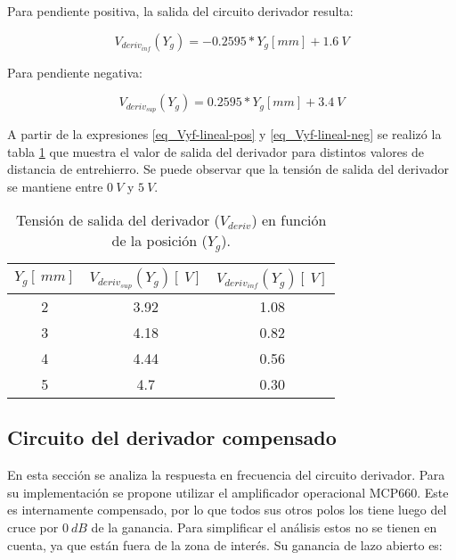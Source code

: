 
Para pendiente positiva, la salida del circuito derivador resulta:

\begin{equation} \label{eq_Vyf-lineal-pos}
	V_{deriv_{inf}}(Y_g) = -0.2595*Y_g[mm] + 1.6\:V
\end{equation}


Para pendiente negativa:

\begin{equation} \label{eq_Vyf-lineal-neg}
	V_{deriv_{sup}}(Y_g) = 0.2595*Y_g[mm] + 3.4\:V
\end{equation}


A partir de la expresiones \ref{eq_Vyf-lineal-pos} y \ref{eq_Vyf-lineal-neg} se realizó la tabla \ref{tab_Vyf_vs_y} que muestra el valor de salida del derivador para distintos valores de distancia de entrehierro. Se puede observar que la tensión de salida del derivador se mantiene entre $0\:V$ y $5\:V$.

\begin{table}[H]
	\begin{center}
		\begin{tabular}{| c | c | c |}
			\hline
			$Y_g[\:mm]$ & $V_{deriv_{sup}}(Y_g) [\:V]$ & $V_{deriv_{inf}}(Y_g) [\:V]$
			\\ \hline
			2 & 3.92 & 1.08\\ \hline 
			3 & 4.18 & 0.82\\ \hline 
			4 & 4.44 & 0.56\\ \hline 
			5 & 4.7  & 0.30\\ \hline 
		\end{tabular}
		\caption{Tensión de salida del derivador ($V_{deriv}$) en función de la posición ($Y_g$).}
		\label{tab_Vyf_vs_y}
	\end{center}
\end{table}


\subsection{Circuito del derivador compensado}

En esta sección se analiza la respuesta en frecuencia del circuito derivador. Para su implementación se propone utilizar el amplificador operacional MCP660. Este es internamente compensado, por lo que todos sus otros polos los tiene luego del cruce por $0\:dB$ de la ganancia. Para simplificar el análisis estos no se tienen en cuenta, ya que están fuera de la zona de interés. Su ganancia de lazo abierto es:

